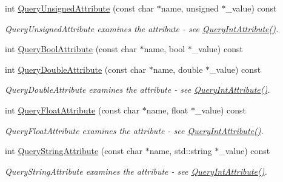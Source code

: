 \begin{DoxyCompactItemize}
\item 
\mbox{\label{class_ti_xml_element_ab75c83543d4ace62f4c40d7e8e392fc3}} 
int \hyperlink{class_ti_xml_element_ab75c83543d4ace62f4c40d7e8e392fc3}{Query\+Unsigned\+Attribute} (const char $\ast$name, unsigned $\ast$\+\_\+value) const
\begin{DoxyCompactList}\small\item\em Query\+Unsigned\+Attribute examines the attribute -\/ see \hyperlink{class_ti_xml_element_a5c0f739e0f6f5905a201364532e54a60}{Query\+Int\+Attribute()}. \end{DoxyCompactList}\item 
int \hyperlink{class_ti_xml_element_a5789b1488af75b6ae37a749700495ceb}{Query\+Bool\+Attribute} (const char $\ast$name, bool $\ast$\+\_\+value) const
\item 
\mbox{\label{class_ti_xml_element_ae04bad29ddb281a7e6c662b3882e9928}} 
int \hyperlink{class_ti_xml_element_ae04bad29ddb281a7e6c662b3882e9928}{Query\+Double\+Attribute} (const char $\ast$name, double $\ast$\+\_\+value) const
\begin{DoxyCompactList}\small\item\em Query\+Double\+Attribute examines the attribute -\/ see \hyperlink{class_ti_xml_element_a5c0f739e0f6f5905a201364532e54a60}{Query\+Int\+Attribute()}. \end{DoxyCompactList}\item 
\mbox{\label{class_ti_xml_element_a5591929834178699b4561ab6ab460068}} 
int \hyperlink{class_ti_xml_element_a5591929834178699b4561ab6ab460068}{Query\+Float\+Attribute} (const char $\ast$name, float $\ast$\+\_\+value) const
\begin{DoxyCompactList}\small\item\em Query\+Float\+Attribute examines the attribute -\/ see \hyperlink{class_ti_xml_element_a5c0f739e0f6f5905a201364532e54a60}{Query\+Int\+Attribute()}. \end{DoxyCompactList}\item 
\mbox{\label{class_ti_xml_element_afa8f8a62753a440186b5cd28e252a4e4}} 
int \hyperlink{class_ti_xml_element_afa8f8a62753a440186b5cd28e252a4e4}{Query\+String\+Attribute} (const char $\ast$name, std\+::string $\ast$\+\_\+value) const
\begin{DoxyCompactList}\small\item\em Query\+String\+Attribute examines the attribute -\/ see \hyperlink{class_ti_xml_element_a5c0f739e0f6f5905a201364532e54a60}{Query\+Int\+Attribute()}. \end{DoxyCompactList}\item 

\end{DoxyCompactItemize}
